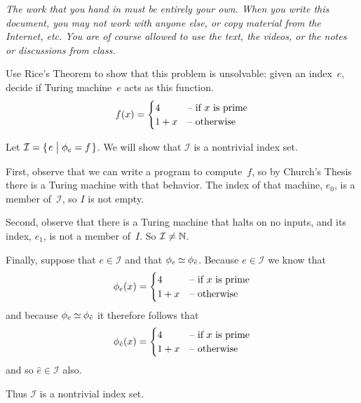 \documentclass[answers, nolegalese]{examjh}
\begin{document}
\thispagestyle{empty}
\vspace*{1ex}
\begin{center}
 \parbox{0.95\textwidth}{\textit{
  The work that you hand in must be entirely your own. 
  When you write this document, you may not work with anyone else,
  or copy material from the Internet, etc.
  You are of course allowed to use the text, the videos, or the notes
  or discussions from class.
  }}
\end{center}
\vspace*{1ex}
\begin{questions}
\question
Use Rice's Theorem to show that this problem is unsolvable: given an index~$e$,
decide if Turing machine~$e$ acts as this function.
\begin{equation*}
  f(x)=
  \begin{cases}
    4   &\text{-- if $x$ is prime}  \\
    1+x &\text{-- otherwise}
  \end{cases}
\end{equation*}
\begin{solution}
Let $\mathcal{I}=\set{e\suchthat \TMfcn_e=f}$.  
We will show that $\mathcal{I}$ is a nontrivial index set.

First, observe that we can write a program to compute~$f$, so by 
Church's Thesis there is a Turing machine with that behavior.
The index of that machine, $e_0$, is a member of~$\mathcal{I}$,
so $I$ is not empty.

Second, observe that there is a Turing machine that halts on no inputs,
and its index, $e_1$, is not a member of~$I$.
So $\mathcal{I}\neq\mathbb{N}$.

Finally, suppose that $e\in\mathcal{I}$ and that 
$\phi_e\mathbin{\simeq}\phi_{\hat{e}}$.
Because $e\in\mathcal{I}$ we know that
\begin{equation*}
  \phi_e(x)=
  \begin{cases}
    4   &\text{-- if $x$ is prime}  \\
    1+x &\text{-- otherwise}
  \end{cases}
\end{equation*}
and because $\phi_e\mathbin{\simeq}\phi_{\hat{e}}$ it therefore follows that
\begin{equation*}
  \phi_{\hat{e}}(x)=
  \begin{cases}
    4   &\text{-- if $x$ is prime}  \\
    1+x &\text{-- otherwise}
  \end{cases}
\end{equation*}
and so $\hat{e}\in\mathcal{I}$ also.

Thus $\mathcal{I}$ is a nontrivial index set.
\end{solution}


\end{questions}
\end{document}
